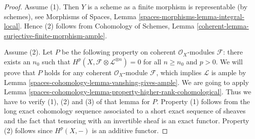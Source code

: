 \begin{proof}
Assume (1). Then $Y$ is a scheme as a finite morphism is representable
(by schemes), see Morphisms of Spaces, Lemma
\ref{spaces-morphisms-lemma-integral-local}. Hence (2)
follows from Cohomology of Schemes, Lemma
\ref{coherent-lemma-surjective-finite-morphism-ample}.

\medskip\noindent
Assume (2). Let $P$ be the following property on
coherent $\mathcal{O}_X$-modules $\mathcal{F}$: there exists an $n_0$
such that $H^p(X, \mathcal{F} \otimes \mathcal{L}^{\otimes n}) = 0$
for all $n \geq n_0$ and $p > 0$. We will prove that $P$ holds
for any coherent $\mathcal{O}_X$-module $\mathcal{F}$, which implies
$\mathcal{L}$ is ample by Lemma \ref{spaces-cohomology-lemma-vanshing-gives-ample}.
We are going to apply Lemma \ref{spaces-cohomology-lemma-property-higher-rank-cohomological}.
Thus we have to verify (1), (2) and (3) of that lemma for $P$.
Property (1) follows from the long exact cohomology sequence associated
to a short exact sequence of sheaves and the fact that tensoring with
an invertible sheaf is an exact functor. Property (2) follows since
$H^p(X, -)$ is an additive functor.


\end{proof}
